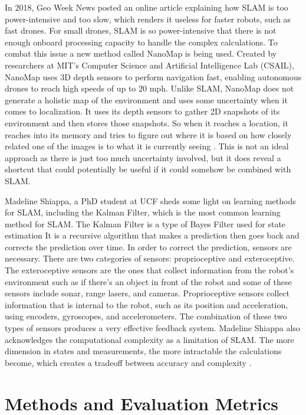 \documentclass[10pt,twocolumn]{article}
\begin{document}
In 2018, Geo Week News posted an online article explaining how SLAM is too power-intensive and too slow, which renders it useless for faster robots, such as fast drones. For small drones, SLAM is so power-intensive that there is not enough onboard processing capacity to handle the complex calculations. To combat this issue a new method called NanoMap is being used. Created by researchers at MIT’s Computer Science and Artificial Intelligence Lab (CSAIL), NanoMap uses 3D depth sensors to perform navigation fast, enabling autonomous drones to reach high speeds of up to 20 mph. Unlike SLAM, NanoMap does not generate a holistic map of the environment and uses some uncertainty when it comes to localization. It uses its depth sensors to gather 2D snapshots of its environment and then stores those snapshots. So when it reaches a location, it reaches into its memory and tries to figure out where it is based on how closely related one of the images is to what it is currently seeing \textcite{GeoWeekNewsStaff2018NanoMap}. This is not an ideal approach as there is just too much uncertainty involved, but it does reveal a shortcut that could potentially be useful if it could somehow be combined with SLAM.

Madeline Shiappa, a PhD student at UCF sheds some light on learning methods for SLAM, including the Kalman Filter, which is the most common learning method for SLAM. The Kalman Filter is a type of Bayes Filter used for state estimation It is a recursive algorithm that makes a prediction then goes back and corrects the prediction over time. In order to correct the prediction, sensors are necessary. There are two categories of sensors: proprioceptive and exteroceptive. The exteroceptive sensors are the ones that collect information from the robot’s environment such as if there’s an object in front of the robot and some of these sensors include sonar, range lasers, and cameras. Proprioceptive sensors collect information that is internal to the robot, such as its position and acceleration, using encoders, gyroscopes, and accelerometers. The combination of these two types of sensors produces a very effective feedback system. Madeline Shiappa also acknowledges the computational complexity as a limitation of SLAM. The more dimension in states and measurements, the more intractable the calculations become, which creates a tradeoff between accuracy and complexity \textcite{Schiappa2019HowDoesAutonomous}.



\section{Methods and Evaluation Metrics}
\end{document}

